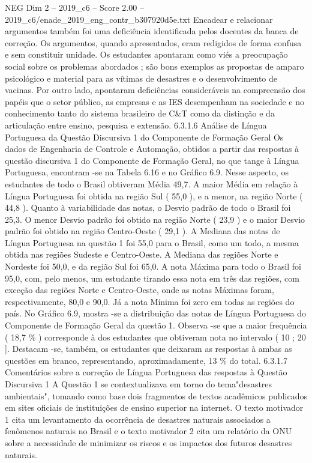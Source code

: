 \begin{textsample}{NEG Dim 2 – 2019\_c6 – Score 2.00 – 2019\_c6/enade\_2019\_eng\_contr\_b307920d5e.txt}
Encadear e relacionar argumentos também foi uma deficiência identificada pelos docentes da banca de correção.
Os argumentos, quando apresentados, eram redigidos de forma confusa e sem constituir unidade.
Os estudantes apontaram como viés a preocupação social sobre os problemas abordados ; são bons exemplos as propostas de amparo psicológico e material para as vítimas de desastres e o desenvolvimento de vacinas.
Por outro lado, apontaram deficiências consideráveis na compreensão dos papéis que o setor público, as empresas e as IES desempenham na sociedade e no conhecimento tanto do sistema brasileiro de C\&T como da distinção e da articulação entre ensino, pesquisa e extensão. 6.3.1.6 Análise de Língua Portuguesa da Questão Discursiva 1 do Componente de Formação Geral Os dados de Engenharia de Controle e Automação, obtidos a partir das respostas à questão discursiva 1 do Componente de Formação Geral, no que tange à Língua Portuguesa, encontram -se na Tabela 6.16 e no Gráfico 6.9.
Nesse aspecto, os estudantes de todo o Brasil obtiveram Média 49,7.
A maior Média em relação à Língua Portuguesa foi obtida na região Sul ( 55,0 ), e a menor, na região Norte ( 44,8 ).
Quanto à variabilidade das notas, o Desvio padrão de todo o Brasil foi 25,3.
O menor Desvio padrão foi obtido na região Norte ( 23,9 ) e o maior Desvio padrão foi obtido na região Centro-Oeste ( 29,1 ).
A Mediana das notas de Língua Portuguesa na questão 1 foi 55,0 para o Brasil, como um todo, a mesma obtida nas regiões Sudeste e Centro-Oeste.
A Mediana das regiões Norte e Nordeste foi 50,0, e da região Sul foi 65,0.
A nota Máxima para todo o Brasil foi 95,0, com, pelo menos, um estudante tirando essa nota em três das regiões, com exceção das regiões Norte e Centro-Oeste, onde as notas Máximas foram, respectivamente, 80,0 e 90,0.
Já a nota Mínima foi zero em todas as regiões do país.
No Gráfico 6.9, mostra -se a distribuição das notas de Língua Portuguesa do Componente de Formação Geral da questão 1.
Observa -se que a maior frequência ( 18,7 \% ) corresponde à dos estudantes que obtiveram nota no intervalo ( 10 ; 20 ].
Destacam -se, também, os estudantes que deixaram as respostas à ambas as questões em branco, representando, aproximadamente, 13 \% do total. 6.3.1.7 Comentários sobre a correção de Língua Portuguesa das respostas à Questão Discursiva 1 A Questão 1 se contextualizava em torno do tema"desastres ambientais", tomando como base dois fragmentos de textos acadêmicos publicados em sites oficiais de instituições de ensino superior na internet.
O texto motivador 1 cita um levantamento da ocorrência de desastres naturais associados a fenômenos naturais no Brasil e o texto motivador 2 cita um relatório da ONU sobre a necessidade de minimizar os riscos e os impactos dos futuros desastres naturais.

\end{textsample}
